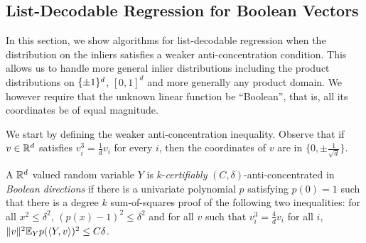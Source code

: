 



\subsection{List-Decodable Regression for Boolean Vectors} \label{sec:hypercube}

In this section, we show algorithms for list-decodable regression when the distribution on the inliers satisfies a weaker anti-concentration condition. This allows us to handle more general inlier distributions including the product distributions on $\{\pm 1\}^d$, $[0,1]^d$ and more generally any product domain. We however require that the unknown linear function be ``Boolean'', that is, all its coordinates be of equal magnitude.

We start by defining the weaker anti-concentration inequality. Observe that if $v \in \mathbb R^d$ satisfies $v_i^3 = \frac{1}{d} v_i$ for every $i$, then the coordinates of $v$ are in $\{0,\pm \frac{1}{\sqrt{d}}\}$.

\begin{definition} \label{def:certified-anti-concentration-Boolean}
A $\mathbb R^d$ valued random variable $Y$ is $k$-\emph{certifiably} $(C,\delta)$-anti-concentrated in \emph{Boolean directions} if there is a univariate polynomial $p$ satisfying $p(0) = 1$ such that there is a degree $k$ sum-of-squares proof of the following two inequalities: for all $x^2 \leq \delta^2$, $(p(x) - 1)^2 \leq \delta^2$ and for all $v$ such that $v_i^3 = \frac{4}{d} v_i$ for all $i$, $\|v\|^2 \mathbb{E}_{Y} p(\langle Y,v\rangle)^2 \leq C\delta$. 
\end{definition} 

